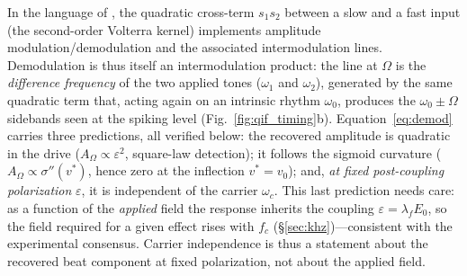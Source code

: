 \documentclass[11pt,a4paper]{article}
\newcommand{\Sig}{\sigma}
\begin{document}
In the language of \cite{ruffini2025ham}, the quadratic cross-term $s_1 s_2$ between a
slow and a fast input (the second-order Volterra kernel) implements amplitude
modulation/demodulation and the associated intermodulation lines.
Demodulation is thus itself an intermodulation product: the line at $\Omega$ is the
\emph{difference frequency} of the two applied tones ($\omega_1$ and $\omega_2$),
generated by the same quadratic term that, acting again on an intrinsic
rhythm $\omega_0$, produces the $\omega_0\pm\Omega$ sidebands seen at the spiking level
(Fig.~\ref{fig:qif_timing}b).
Equation~\eqref{eq:demod} carries three predictions, all verified below: the
recovered amplitude is quadratic in the drive ($A_\Omega\propto\varepsilon^2$,
square-law detection); it follows the sigmoid curvature
($A_\Omega\propto\Sig''(v^*)$, hence zero at the inflection $v^*=v_0$); and, \emph{at
fixed post-coupling polarization} $\varepsilon$, it is independent of the carrier
$\omega_c$. This last prediction needs care: as a function of the \emph{applied} field the
response inherits the coupling $\varepsilon=\lambda_f E_0$, so the field required for a
given effect rises with $f_c$ (\S\ref{sec:khz})---consistent with the experimental
consensus. Carrier independence is thus a statement about the recovered beat component at fixed
polarization, not about the applied field.
\end{document}
